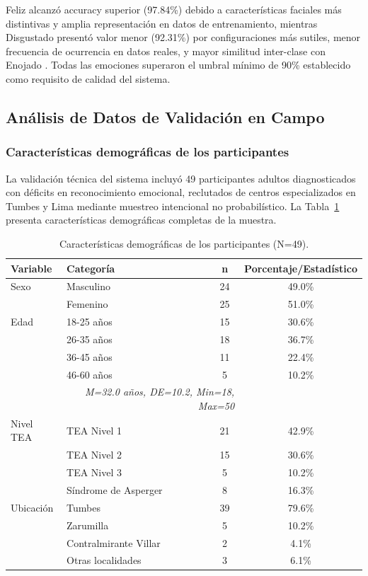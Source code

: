 \documentclass[journal,article,submit,pdftex,moreauthors]{Definitions/mdpi}
\begin{document}
	Feliz alcanzó accuracy superior (97.84\%) debido a características faciales más distintivas y amplia representación en datos de entrenamiento, mientras Disgustado presentó valor menor (92.31\%) por configuraciones más sutiles, menor frecuencia de ocurrencia en datos reales, y mayor similitud inter-clase con Enojado \cite{ref11,ref12,ref33}. Todas las emociones superaron el umbral mínimo de 90\% establecido como requisito de calidad del sistema.
	
	\subsection{Análisis de Datos de Validación en Campo}
	
	\subsubsection{Características demográficas de los participantes}
	
	La validación técnica del sistema incluyó 49 participantes adultos diagnosticados con déficits en reconocimiento emocional, reclutados de centros especializados en Tumbes y Lima mediante muestreo intencional no probabilístico. La Tabla~\ref{tab5} presenta características demográficas completas de la muestra.
	
	\begin{table}[H]
		\caption{Características demográficas de los participantes (N=49).\label{tab5}}
		\begin{tabularx}{\textwidth}{llcc}
			\toprule
			\textbf{Variable} & \textbf{Categoría} & \textbf{n} & \textbf{Porcentaje/Estadístico} \\
			\midrule
			Sexo & Masculino & 24 & 49.0\% \\
			& Femenino & 25 & 51.0\% \\
			\midrule
			Edad & 18-25 años & 15 & 30.6\% \\
			& 26-35 años & 18 & 36.7\% \\
			& 36-45 años & 11 & 22.4\% \\
			& 46-60 años & 5 & 10.2\% \\
			& \multicolumn{2}{r}{\textit{M=32.0 años, DE=10.2, Min=18, Max=50}} \\
			\midrule
			Nivel TEA & TEA Nivel 1 & 21 & 42.9\% \\
			& TEA Nivel 2 & 15 & 30.6\% \\
			& TEA Nivel 3 & 5 & 10.2\% \\
			& Síndrome de Asperger & 8 & 16.3\% \\
			\midrule
			Ubicación & Tumbes & 39 & 79.6\% \\
			& Zarumilla & 5 & 10.2\% \\
			& Contralmirante Villar & 2 & 4.1\% \\
			& Otras localidades & 3 & 6.1\% \\
			\bottomrule
		\end{tabularx}
	\end{table}
	
\end{document}

